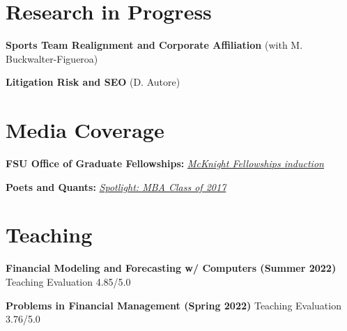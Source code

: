 \documentclass[letterpaper,11pt]{article}
\newcommand{\resumeSubHeadingListStart}{\begin{itemize}[leftmargin=0.15in, label={}]}
\newcommand{\resumeSubHeadingListEnd}{\end{itemize}}
\begin{document}

\section{Research in Progress}
\vspace{2pt}
\resumeSubHeadingListStart
  \small{\item{
      
      \textbf{Sports Team Realignment and Corporate Affiliation}{ (with M. Buckwalter-Figueroa)} \\ \vspace{3pt}
      
      \textbf{Litigation Risk and SEO}{ (D. Autore) } \\ \vspace{3pt}
      
  }}
\resumeSubHeadingListEnd



\section{Media Coverage}
  \vspace{2pt}
  \resumeSubHeadingListStart
    \small{\item{
        \textbf{FSU Office of Graduate Fellowships:}{ \emph{\href{https://ogfa.fsu.edu/graduate/rodney-ndum}{\color{blue}McKnight Fellowships induction}}} \\ \vspace{3pt}
        
        \textbf{Poets and Quants:}{ \emph{\href{https://poetsandquants.com/2016/05/04/meet-florida-warringtons-mba-class-2017/5/}{\color{blue}Spotlight: MBA Class of 2017}}} \\ \vspace{3pt}
        
    }}
  \resumeSubHeadingListEnd



\section{Teaching}
\vspace{2pt}
\resumeSubHeadingListStart
  \small{\item{
      
      \textbf{Financial Modeling and Forecasting w/ Computers (Summer 2022)}{ Teaching Evaluation 4.85/5.0} \\ \vspace{3pt}
      
      \textbf{Problems in Financial Management (Spring 2022)}{ Teaching Evaluation 3.76/5.0} \\ \vspace{3pt}
      
  }}
\resumeSubHeadingListEnd
\end{document}
